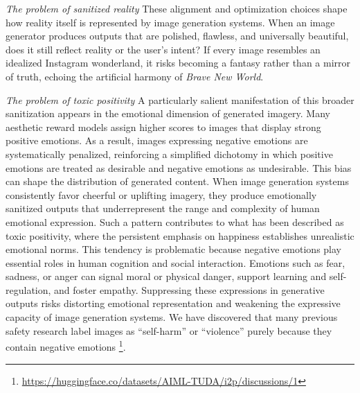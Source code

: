 \textit{The problem of sanitized reality} 
These alignment and optimization choices shape how reality itself is represented by image generation systems. When an image generator produces outputs that are polished, flawless, and universally beautiful, does it still reflect reality or the user’s intent? If every image resembles an idealized Instagram wonderland, it risks becoming a fantasy rather than a mirror of truth, echoing the artificial harmony of \textit{Brave New World}. 

\textit{The problem of toxic positivity} A particularly salient manifestation of this broader sanitization appears in the emotional dimension of generated imagery. Many aesthetic reward models assign higher scores to images that display strong positive emotions. As a result, images expressing negative emotions are systematically penalized, reinforcing a simplified dichotomy in which positive emotions are treated as desirable and negative emotions as undesirable. This bias can shape the distribution of generated content. When image generation systems consistently favor cheerful or uplifting imagery, they produce emotionally sanitized outputs that underrepresent the range and complexity of human emotional expression. Such a pattern contributes to what has been described as toxic positivity, where the persistent emphasis on happiness establishes unrealistic emotional norms. This tendency is problematic because negative emotions play essential roles in human cognition and social interaction. Emotions such as fear, sadness, or anger can signal moral or physical danger, support learning and self-regulation, and foster empathy. Suppressing these expressions in generative outputs risks distorting emotional representation and weakening the expressive capacity of image generation systems. We have discovered that many previous safety research \cite{schramowski_safe_2023} label images as ``self-harm'' or ``violence'' purely because they contain negative emotions \footnote{\url{https://huggingface.co/datasets/AIML-TUDA/i2p/discussions/1}}. 

